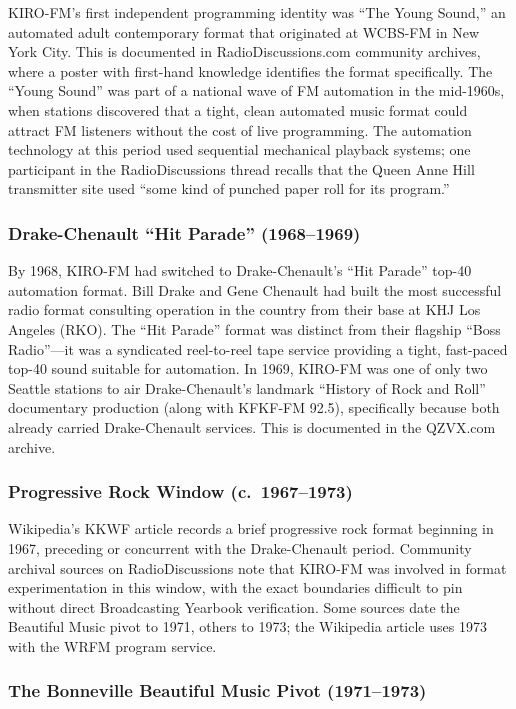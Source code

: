 \documentclass[11pt,letterpaper]{article}
\begin{document}
KIRO-FM's first independent programming identity was ``The Young Sound,'' an automated adult contemporary format that originated at WCBS-FM in New York City. This is documented in RadioDiscussions.com community archives, where a poster with first-hand knowledge identifies the format specifically. The ``Young Sound'' was part of a national wave of FM automation in the mid-1960s, when stations discovered that a tight, clean automated music format could attract FM listeners without the cost of live programming. The automation technology at this period used sequential mechanical playback systems; one participant in the RadioDiscussions thread recalls that the Queen Anne Hill transmitter site used ``some kind of punched paper roll for its program.''

\subsubsection{Drake-Chenault ``Hit Parade'' (1968--1969)}

By 1968, KIRO-FM had switched to Drake-Chenault's ``Hit Parade'' top-40 automation format. Bill Drake and Gene Chenault had built the most successful radio format consulting operation in the country from their base at KHJ Los Angeles (RKO). The ``Hit Parade'' format was distinct from their flagship ``Boss Radio''---it was a syndicated reel-to-reel tape service providing a tight, fast-paced top-40 sound suitable for automation. In 1969, KIRO-FM was one of only two Seattle stations to air Drake-Chenault's landmark ``History of Rock and Roll'' documentary production (along with KFKF-FM 92.5), specifically because both already carried Drake-Chenault services. This is documented in the QZVX.com archive.

\subsubsection{Progressive Rock Window (c.\ 1967--1973)}

Wikipedia's KKWF article records a brief progressive rock format beginning in 1967, preceding or concurrent with the Drake-Chenault period. Community archival sources on RadioDiscussions note that KIRO-FM was involved in format experimentation in this window, with the exact boundaries difficult to pin without direct Broadcasting Yearbook verification. Some sources date the Beautiful Music pivot to 1971, others to 1973; the Wikipedia article uses 1973 with the WRFM program service.

\subsubsection{The Bonneville Beautiful Music Pivot (1971--1973)}
\end{document}
